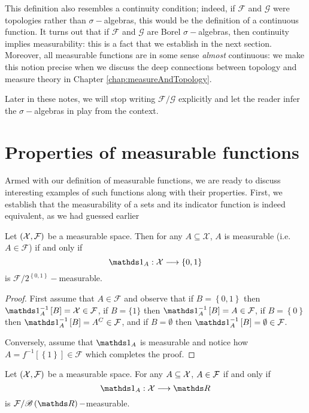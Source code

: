 \begin{rem*}
This definition also resembles a continuity condition; indeed, if
$\mathcal{F}$ and $\mathcal{G}$ were topologies rather than $\sigma-$algebras,
this would be the definition of a continuous function. It turns out
that if $\mathcal{F}$ and $\mathcal{G}$ are Borel $\sigma-$algebras,
then continuity implies measurability: this is a fact that we establish
in the next section. Moreover, all measurable functions are in some
sense \emph{almost }continuous: we make this notion precise when we
discuss the deep connections between topology and measure theory in
Chapter \ref{chap:measureAndTopology}.
\end{rem*}
Later in these notes, we will stop writing $\mathcal{F}/\mathcal{G}$
explicitly and let the reader infer the $\sigma-$algebras in play
from the context.

\section{Properties of measurable functions}

Armed with our definition of measurable functions, we are ready to
discuss interesting examples of such functions along with their properties.
First, we establish that the measurability of a sets and its indicator
function is indeed equivalent, as we had guessed earlier
\begin{prop}
\label{prop:measurableSetsFunctions}Let $\left(\mathcal{X},\mathcal{F}\right)$
be a measurable space. Then for any $A\subseteq\mathcal{X}$, $A$
is measurable (i.e. $A\in\mathcal{F}$) if and only if 
\[
\indicate_{A}:\mathcal{X}\longrightarrow\left\{ 0,1\right\} 
\]
is $\mathcal{F}/2^{\left\{ 0,1\right\} }-$measurable.
\end{prop}

\begin{proof}
First assume that $A\in\mathcal{F}$ and observe that if $B=\left\{ 0,1\right\} $
then $\indicate_{A}^{-1}\left[B\right]=\X\in\mathcal{F}$, if $B=\{1\}$
then $\indicate_{A}^{-1}\left[B\right]=A\in\mathcal{F}$, if $B=\left\{ 0\right\} $
then $\indicate_{A}^{-1}\left[B\right]=A^{C}\in\mathcal{F}$, and
if $B=\emptyset$ then $\indicate_{A}^{-1}\left[B\right]=\emptyset\in\mathcal{F}$.

Conversely, assume that $\indicate_{A}$ is measurable and notice
how $A=f^{-1}\left[\left\{ 1\right\} \right]\in\mathcal{F}$ which
completes the proof.
\end{proof}
\begin{cor}
\label{cor:borelMeasurableSetsFunctions}Let $\left(\mathcal{X},\mathcal{F}\right)$
be a measurable space. For any $A\subseteq\mathcal{X}$, $A\in\mathcal{F}$ if and only
if
\[
\indicate_{A}:\X\longrightarrow\R
\]
is $\F/\borel\left(\R\right)-$measurable.
\end{cor}


